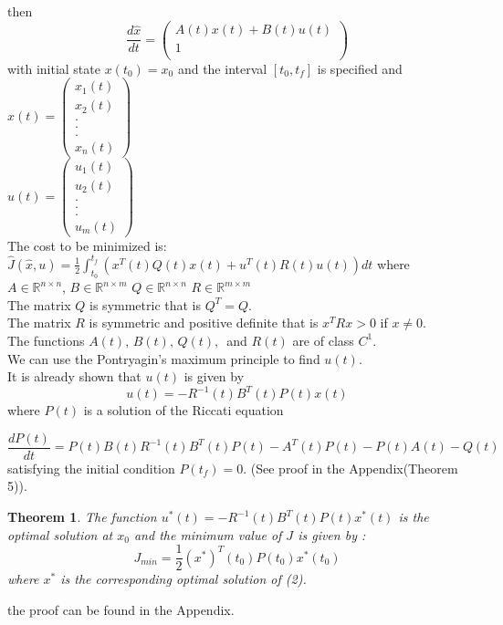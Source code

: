 \documentclass[12pt]{article}
\newtheorem{theorem}{Theorem}
\begin{document}
then 
\begin{equation}
 \frac{d\hat{x}}{dt}=\left(\begin{array}{c}
  A(t)x(t)+B(t)u(t)      \\
1\\   
\end{array}\right)
\end{equation}
with initial state $x(t_0)=x_0$ and the interval $[t_0,t_f]$ is specified  and $x(t)=\left(\begin{array}{c}
x_1(t)       \\
x_2(t) \\
   .\\
   .\\
    .\\   
    x_n(t)
\end{array}\right)$ \\
 $u(t)=\left(\begin{array}{c}
u_1(t)       \\
u_2(t) \\
   .\\
   .\\
    .\\   
    u_m(t)
\end{array}\right)$ \\
The cost to be minimized  is:
$\hat{J}(\hat{x},u)=\frac{1}{2}\int_{t_0}^{t_f} (x^T(t)Q(t)x(t)+u^T(t)R(t)u(t))dt$
where $A\in {\mathbb R}^{n\times n}$,  $B\in  {\mathbb R}^{n\times m} $
$ Q\in {\mathbb R}^{n\times n}$ $R\in {\mathbb R}^{m\times m}$\\
The matrix  $Q$ is symmetric that is $Q^T=Q$.\\
The matrix $R$ is symmetric and  positive definite that is $x^TRx>0$ if $x\neq 0$.\\
The functions $A(t),\, B(t), \, Q(t), \, $ and $R(t)$ are of class $C^1$.\\
We can use the Pontryagin's maximum principle to find  $u(t)$.\\
It is already  shown  that $u(t)$ is given  by
 $$u(t)=-R^{-1}(t)B^T(t)P(t)x(t)$$
where  $P(t)$ is a solution of the Riccati equation

\begin{equation}
    \frac{dP(t)}{dt}=P(t)B(t)R^{-1}(t)B^T(t)P(t)-A^T(t)P(t)-P(t)A(t)-Q(t)
\end{equation}
satisfying the initial condition $P(t_f)=0.$ (See proof in the Appendix(Theorem 5)).
\begin{theorem}
    The  function $u^*(t)=-R^{-1}(t)B^T(t)P(t)x^*(t)$
is the optimal solution at $x_0$ and the minimum value of $J$ is given
 by : $$J_{min}=\frac{1}{2}(x^*)^T(t_0)P(t_0)x^*(t_0)$$ 
 where $x^*$ is the corresponding optimal solution of (2).
\end{theorem}
the proof can be found in the Appendix.
\end{document}
